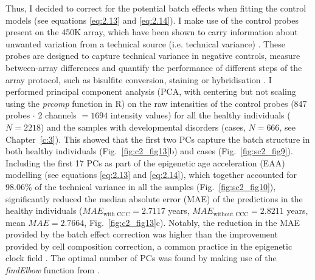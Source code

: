 Thus, I decided to correct for the potential batch effects when fitting the control models (see equations \ref{eq:2.13} and \ref{eq:2.14}). I make use of the control probes present on the 450K array, which have been shown to carry information about unwanted variation from a technical source (i.e. technical variance)  \cite{Maksimovic2015,Fortin2014,Gagnon-Bartsch2012}. These probes are designed to capture technical variance in negative controls, measure between-array differences and quantify the performance of different steps of the array protocol, such as bisulfite conversion, staining or hybridisation \cite{Fortin2014,Illumina2010}. I performed principal component analysis (PCA, with centering but not scaling using the \textit{prcomp} function in R) on the raw intensities of the control probes (847 probes $\cdot$ 2 channels $= 1694$ intensity values) for all the healthy individuals ($N=2218$) and the samples with developmental disorders (cases, $N=666$, see Chapter~\ref{c:3}). This showed that the first two PCs capture the batch structure in both healthy individuals (Fig.~\ref{fig:c2_fig13}b) and cases (Fig.~\ref{fig:sc2_fig9}). Including the first 17 PCs as part of the epigenetic age acceleration (EAA) modelling (see equations \ref{eq:2.13} and \ref{eq:2.14}), which together accounted for 98.06\% of the technical variance in all the samples (Fig.~\ref{fig:sc2_fig10}), significantly reduced the median absolute error (MAE) of the predictions in the healthy individuals ($MAE_{\text{with CCC}} = 2.7117$ years, $MAE_{\text{without CCC}} = 2.8211$ years, mean $MAE = 2.7664$, Fig.~\ref{fig:c2_fig13}c). Notably, the reduction in the MAE provided by the batch effect correction was higher than the improvement provided by cell composition correction, a common practice in the epigenetic clock field \cite{Horvath2016, Chen2016}. The optimal number of PCs was found by making use of the \textit{findElbow} function from \cite{Akalin2014}. 

